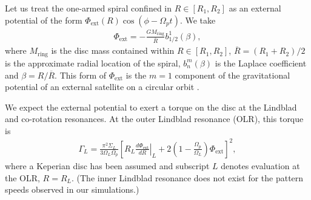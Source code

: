 Let us treat the one-armed spiral confined in $R\in[R_1,R_2]$ as an  
external potential of the form $\Phi_\mathrm{ext}(R)\cos{\left(\phi -
    \Omega_pt\right)}$. We take 
\begin{align} 
  \Phi_\mathrm{ext}
  =-\frac{GM_\mathrm{ring}}{\overline{R}}b^{1}_{1/2}(\beta),   
\end{align}
where $M_\mathrm{ring}$ is the disc mass contained within
$R\in[R_1,R_2]$, $\overline{R} = (R_1+R_2)/2$ is the approximate radial
location of the spiral, $b_{n}^m(\beta)$ is the Laplace coefficient
and $\beta = R/\overline{R}$. This form of
$\Phi_\mathrm{ext}$ is the $m=1$ component of the gravitational
potential of an external satellite on a circular orbit
\citep{goldreich79}.    



We expect the external potential to exert a torque on the disc at the
Lindblad and co-rotation resonances. At the outer Lindblad resonance
(OLR), this torque is 
\begin{align}
  \Gamma_L =
  \frac{\pi^2\Sigma_L}{3\Omega_L\Omega_p}
  \left[\left.R_L\frac{d\Phi_\mathrm{ext}}{dR}\right|_L + 2\left(1 - \frac{\Omega_p}{\Omega_L}\right)\Phi_\mathrm{ext}\right]^2,
\end{align}   
where a Keperian disc has been assumed and subscript $L$ denotes
evaluation at the OLR, $R=R_L$. (The inner Lindblad resonance does not
exist for the pattern speeds observed in our simulations.) 

